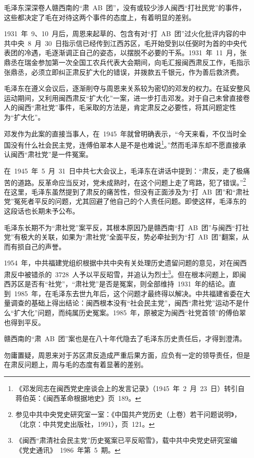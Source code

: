 毛泽东深深卷人赣西南的“肃~AB~团”，没有或较少涉人闽西“打社民党”的事件，这些都决定了毛在对待这两个事件的态度上，有着明显的差别。

1931~年~9、10~月后，周恩来起草的、包含有对“打~AB~团”过火化批评内容的中共中央~8~月~30~日指示信已经传到江西苏区，毛开始受到以任弼时为首的中央代表团的冷遇，毛逐渐调正自己的姿态，以摆脱不必要的干系。1931~年~11~月，张鼎丞在瑞金参加第一次全国工农兵代表大会期间，向毛汇报闽西肃反工作，毛指示张鼎丞，必须立即纠正肃反扩大化的错误，并拨款五千银元，作为善后救济费。

毛泽东在遵义会议后，逐渐削夺与周恩来关系较为密切的邓发的权力。在延安整风运动期间，又利用闽西肃反“扩大化”一案，进一步打击邓发。对于自己未曾直接卷人的闽西“肃社党”事件，毛采取的方法是，肯定肃反之必要性，将其问题定性为“扩大化”。

邓发作为此案的直接当事人，在~1945~年就曾明确表示，“今天来看，不仅当时全国没有什么社会民主党，连傅伯翠本人是不是也难说\footnote{《邓发同志在闽西党史座谈会上的发言记录》（1945~年~2~月~23~日）转引自蒋伯英：《闽西革命根据地史》页~189。}。”然而毛泽东却不愿直接承认闽西“肃社党”是一件冤案。

在~1945~年~5~月~31~日中共七大会议上，毛泽东在讲话中提到：“肃反，走了极痛苦的道路。反革命应当反对，党未成熟时，在这个问题上走了弯路，犯了错误。”\footnote{参见中共中央党史研究室一室：《中国共产党历史（上卷）若干问题说明》，（北京：中共党史出版社，1991），页~121。}在这里，毛泽东虽然提到了肃反的痛苦性，但没有正面涉及为“打~AB~团”和“肃社党”冤死者平反的问题，尤其回避了他自己的个人责任问题。即使这样，毛泽东的这段话也长期未予公布。

毛泽东长期不为“肃社党”案平反，其根本原因乃是赣西南“打~AB~团”与闽西“打社党”有极大的关联，如果为“肃社党”全面平反，势必牵扯到为“打~AB~团”翻案，从而有损自己的声誉。

1954~年，中共福建党组织根据中共中央有关处理历史遗留问题的意见，对在闽西肃反中被错杀的~3728~人予以平反昭雪，并追认为烈士\footnote{《闽西“肃清社会民主党”历史冤案已平反昭雪》，载中共中央党史研究室编《党史通讯》~1986~年第~5~期。}。但在根本问题上，即闽西苏区是否有“社党”，“肃社党”是否是冤案，则全部维持~1931~年的结论。直到~1985~年，在毛泽东去世九年后，这个问题才最终得以解决。中共福建省委在大量调查的基础上得出结论：闽西根本没有“社会民主党”，闽西“肃社党”运动不是什么“扩大化”问题，而纯属历史冤案。1985~年，原被定为闽西“社党首领”的傅伯翠也得到平反。

赣西南的“肃~AB~团”案也是在八十年代隐去了毛泽东历史责任后，才得到澄清。

勿庸置疑，周恩来对于苏区肃反造成严重后果方面，应负有一定的领导责任，但是在肃反问题上，周与毛的态度有着显著的差别。

